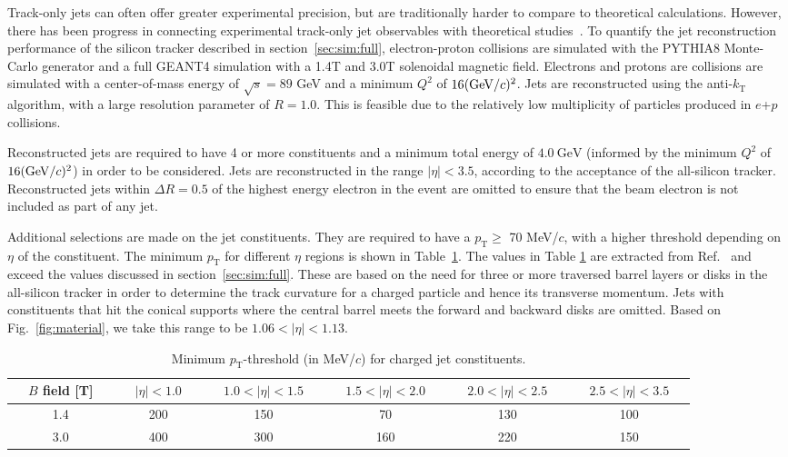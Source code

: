 Track-only jets can often offer greater experimental precision, but are traditionally harder to compare to theoretical calculations. However, there has been progress in connecting experimental track-only jet observables with theoretical studies~\cite{PhysRevD.88.034030}. To quantify the jet reconstruction performance of the silicon tracker described in section~\ref{sec:sim:full}, electron-proton collisions are simulated with the PYTHIA8 Monte-Carlo generator and a full GEANT4 simulation with a 1.4T and 3.0T solenoidal magnetic field. Electrons and protons are collisions are simulated with a center-of-mass energy of $\sqrt{s}=89$ GeV and a minimum $Q^2$ of  $16(\mathrm{GeV}/c)^2$. Jets are reconstructed using the anti-$k_\mathrm{T}$ algorithm, with a large resolution parameter of $R= 1.0$. This is feasible due to the relatively low multiplicity of particles produced in $e$+$p$ collisions. 

Reconstructed jets are required to have 4 or more constituents and a minimum total energy of $4.0~\mathrm{GeV}$ (informed by the minimum $Q^2$ of $16(\mathrm{GeV}/c)^2$) in order to be considered. Jets are reconstructed in the range $|\eta|<3.5$, according to the acceptance of the all-silicon tracker. Reconstructed jets within $\Delta R = 0.5$ of the highest energy electron in the event are omitted to ensure that the beam electron is not included as part of any jet.

Additional selections are made on the jet constituents. They are required to have a $p_\mathrm{T} \geq$ 70 MeV/$c$, with a higher threshold depending on $\eta$ of the constituent. The minimum $p_\mathrm{T}$ for different $\eta$ regions is shown in Table~\ref{tab:min_pt1}. The values in Table \ref{tab:min_pt1} are extracted from Ref.~\cite{DMtable:2020} and exceed the values discussed in section~\ref{sec:sim:full}. These are based on the need for three or more traversed barrel layers or disks in the all-silicon tracker in order to determine the track curvature for a charged particle and hence its transverse momentum. Jets with constituents that hit the conical supports where the central barrel meets the forward and backward disks are omitted. Based on Fig.~\ref{fig:material}, we take this range to be $1.06 < |\eta| < 1.13$.

\begin{table}[htb]
\caption{Minimum $p_\mathrm{T}$-threshold (in MeV/$c$) for charged jet constituents.}
\begin{tabular}{  c | c | c | c | c | c  }
~~$B$ field [T]~~& ~~$ |\eta| < 1.0 $~~ & ~~$ 1.0 < |\eta| < 1.5  $~~ & ~~$1.5 < |\eta| < 2.0 $~~ & ~~$ 2.0 < |\eta| < 2.5 $~~ & ~~$2.5 < |\eta| < 3.5$~~\\
\hline \hline
1.4 & 200 & 150 & 70  & 130  & 100 \\
3.0 & 400 & 300 & 160  & 220  & 150 \\
\end{tabular}
\label{tab:min_pt1}
\end{table}

